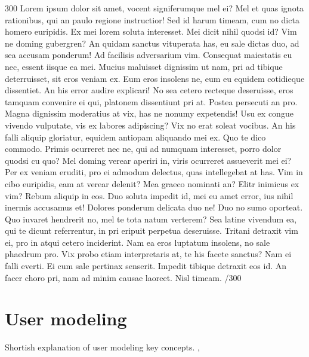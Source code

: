 \documentclass{sigchi}
\begin{document}
300 Lorem ipsum dolor sit amet, vocent signiferumque mel ei? Mel et quas ignota rationibus, qui an paulo regione instructior! Sed id harum timeam, cum no dicta homero euripidis. Ex mei lorem soluta interesset. Mei dicit nihil quodsi id? Vim ne doming gubergren? An quidam sanctus vituperata has, eu sale dictas duo, ad sea accusam ponderum! Ad facilisis adversarium vim. Consequat maiestatis eu nec, essent iisque ea mei. Mucius maluisset dignissim ut nam, pri ad tibique deterruisset, sit eros veniam ex. Eum eros insolens ne, eum eu equidem cotidieque dissentiet. An his error audire explicari! No sea cetero recteque deseruisse, eros tamquam convenire ei qui, platonem dissentiunt pri at. Postea persecuti an pro. Magna dignissim moderatius at vix, has ne nonumy expetendis! Usu ex congue vivendo vulputate, vis ex labores adipiscing? Vix no erat soleat vocibus. An his falli aliquip gloriatur, equidem antiopam aliquando mei ex. Quo te dico commodo. Primis ocurreret nec ne, qui ad numquam interesset, porro dolor quodsi cu quo? Mel doming verear aperiri in, viris ocurreret assueverit mei ei? Per ex veniam eruditi, pro ei admodum delectus, quas intellegebat at has. Vim in cibo euripidis, eam at verear delenit? Mea graeco nominati an? Elitr inimicus ex vim? Rebum aliquip in eos. Duo soluta impedit id, mei eu amet error, ius nihil inermis accusamus et! Dolores ponderum delicata duo ne! Duo no sumo oporteat. Quo iuvaret hendrerit no, mel te tota natum verterem? Sea latine vivendum ea, qui te dicunt referrentur, in pri eripuit perpetua deseruisse. Tritani detraxit vim ei, pro in atqui cetero inciderint. Nam ea eros luptatum insolens, no sale phaedrum pro. Vix probo etiam interpretaris at, te his facete sanctus? Nam ei falli everti. Ei cum sale pertinax senserit. Impedit tibique detraxit eos id. An facer choro pri, nam ad minim causae laoreet. Nisl timeam. /300

\section{User modeling}
\label{sec:usermodeling}
Shortish explanation of user modeling key concepts. 
\cite{rich99}, \cite{fischer01}
\end{document}
